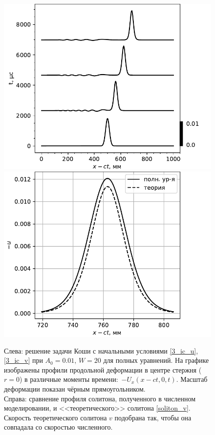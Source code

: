 \documentclass[12pt, a4paper]{report}
\begin{document}
\begin{figure}[h]
	\centering
	\includegraphics[width=0.49\linewidth]{figures/SolEvol}
	\includegraphics[width=0.49\linewidth]{figures/SolCompare}
	\caption{Слева: решение задачи Коши с начальными условиями \eqref{3_ic_u}, \eqref{3_ic_v} при $A_0=0.01$, $W=20$ для полных уравнений. На графике изображены профили продольной деформации в центре стержня ($r=0$) в различные моменты времени:~$-U_x(x - ct, 0, t)$. Масштаб деформации показан чёрным прямоугольником.\\ Справа: сравнение профиля солитона, полученного в численном моделировании, и <<теоретического>> солитона \eqref{soliton_v}. Скорость теоретического солитона $v$ подобрана так, чтобы она совпадала со скоростью численного.}
	\label{fig:evol_compar1}
\end{figure}
\end{document}
